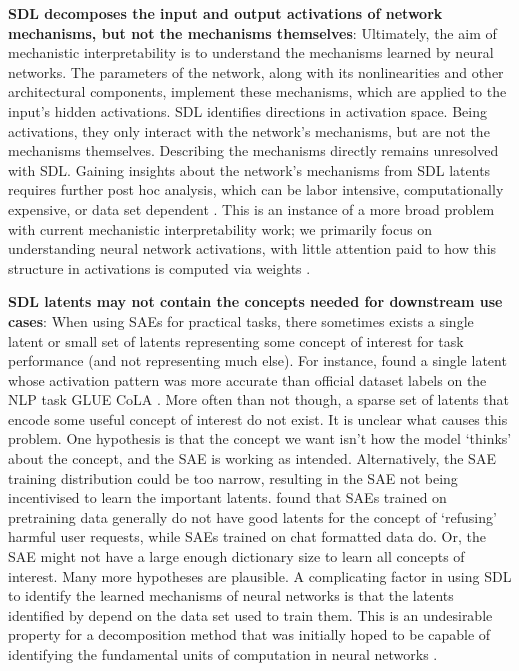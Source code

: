 \textbf{SDL decomposes the input and output activations of network mechanisms, but not the mechanisms themselves}: Ultimately, the aim of mechanistic interpretability is to understand the mechanisms learned by neural networks. The parameters of the network, along with its nonlinearities and other architectural components, implement these mechanisms, which are applied to the input's hidden activations. SDL identifies directions in activation space. Being activations, they only interact with the network's mechanisms, but are not the mechanisms themselves. Describing the mechanisms directly remains unresolved with SDL. Gaining insights about the network's mechanisms from SDL latents requires further post hoc analysis, which can be labor intensive, computationally expensive, or data set dependent \citep{cunningham2023sparseautoencodershighlyinterpretable,Bricken_2023_dictionary, riggs2023finding,marks2024sparsefeaturecircuitsdiscovering}. This is an instance of a more broad problem with current mechanistic interpretability work; we primarily focus on understanding neural network activations, with little attention paid to how this structure in activations is computed via weights \citep{chughtai2025activation}.


\textbf{SDL latents may not contain the concepts needed for downstream use cases}: When using SAEs for practical tasks, there sometimes exists a single latent or small set of latents representing some concept of interest for task performance (and not representing much else). For instance, \citet{kantamneni2024sae} found a single latent whose activation pattern was more accurate than official dataset labels on the NLP task GLUE CoLA \citep{warstadt2019neuralnetworkacceptabilityjudgments}. More often than not though, a sparse set of latents that encode some useful concept of interest do not exist. It is unclear what causes this problem. One hypothesis is that the concept we want isn't how the model `thinks' about the concept, and the SAE is working as intended. Alternatively, the SAE training distribution could be too narrow, resulting in the SAE not being incentivised to learn the important latents. \citep{kissane2024saes} found that SAEs trained on pretraining data generally do not have good latents for the concept of `refusing' harmful user requests, while SAEs trained on chat formatted data do. Or, the SAE might not have a large enough dictionary size to learn all concepts of interest. Many more hypotheses are plausible. A complicating factor in using SDL to identify the learned mechanisms of neural networks is that the latents identified by depend on the data set used to train them. This is an undesirable property for a decomposition method that was initially hoped to be capable of identifying the fundamental units of computation in neural networks \citep{kissane2024saes}.


